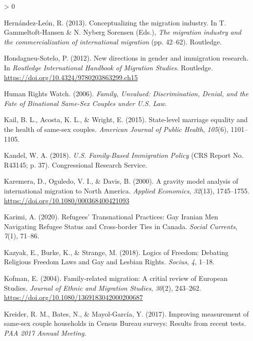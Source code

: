 \documentclass[
  11pt,
]{article}
\newlength{\cslhangindent}
\newenvironment{CSLReferences}[2] %
 {%
  \setlength{\parindent}{0pt}
  \ifodd #1 \everypar{\setlength{\hangindent}{\cslhangindent}}\ignorespaces\fi
  \ifnum #2 > 0
  \setlength{\parskip}{#2\baselineskip}
  \fi
 }%
 {}
\begin{document}
\begin{CSLReferences}{1}{0}
\leavevmode\hypertarget{ref-hernandez-leon_2013}{}%
Hernández-León, R. (2013). Conceptualizing the migration industry. In T. Gammeltoft-Hansen \& N. Nyberg Sorensen (Eds.), \emph{The migration industry and the commercialization of international migration} (pp. 42--62). {Routledge}.

\leavevmode\hypertarget{ref-hondagneu-sotelo_2012}{}%
Hondagneu-Sotelo, P. (2012). New directions in gender and immigration research. In \emph{Routledge {International Handbook} of {Migration Studies}}. {Routledge}. \url{https://doi.org/10.4324/9780203863299.ch15}

\leavevmode\hypertarget{ref-humanrightswatch_2006}{}%
Human Rights Watch. (2006). \emph{Family, {Unvalued}: {Discrimination}, {Denial}, and the {Fate} of {Binational Same}-{Sex Couples} under {U}.{S}. {Law}}.

\leavevmode\hypertarget{ref-kail_2015}{}%
Kail, B. L., Acosta, K. L., \& Wright, E. (2015). State-level marriage equality and the health of same-sex couples. \emph{American Journal of Public Health}, \emph{105}(6), 1101--1105.

\leavevmode\hypertarget{ref-kandel_2018_familybased}{}%
Kandel, W. A. (2018). \emph{U.{S}. {Family}-{Based Immigration Policy}} (CRS Report No. R43145; p. 37). {Congressional Research Service}.

\leavevmode\hypertarget{ref-karemera_2000}{}%
Karemera, D., Oguledo, V. I., \& Davis, B. (2000). A gravity model analysis of international migration to {North America}. \emph{Applied Economics}, \emph{32}(13), 1745--1755. \url{https://doi.org/10.1080/000368400421093}

\leavevmode\hypertarget{ref-karimi_2020}{}%
Karimi, A. (2020). Refugees' {Transnational Practices}: {Gay Iranian Men Navigating Refugee Status} and {Cross}-border {Ties} in {Canada}. \emph{Social Currents}, \emph{7}(1), 71--86.

\leavevmode\hypertarget{ref-kazyak_2018}{}%
Kazyak, E., Burke, K., \& Strange, M. (2018). Logics of {Freedom}: {Debating Religious Freedom Laws} and {Gay} and {Lesbian Rights}. \emph{Socius}, \emph{4}, 1--18.

\leavevmode\hypertarget{ref-kofman_2004_family}{}%
Kofman, E. (2004). Family-related migration: A critial review of {European Studies}. \emph{Journal of Ethnic and Migration Studies}, \emph{30}(2), 243--262. \url{https://doi.org/10.1080/1369183042000200687}

\leavevmode\hypertarget{ref-kreider_2017}{}%
Kreider, R. M., Bates, N., \& Mayol-García, Y. (2017). Improving measurement of same-sex couple households in {Census Bureau} surveys: {Results} from recent tests. \emph{{PAA} 2017 Annual Meeting}.


\end{CSLReferences}
\end{document}
